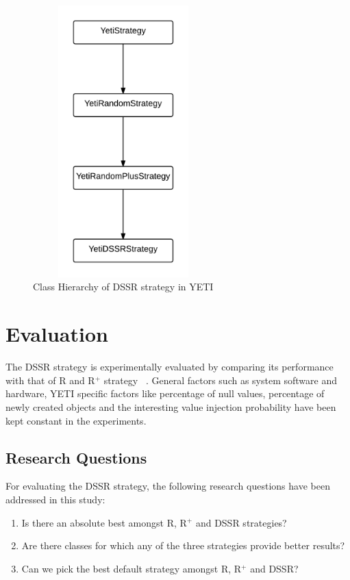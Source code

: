 \begin{figure}[h]
\centering
\includegraphics[width=7cm,height=10.5cm]{chapter4/classHierarchy1.png}
\caption{Class Hierarchy of DSSR strategy in YETI}
\label{fig:hierarchyofDSSR}
\end{figure}







\section{Evaluation}\label{sec:eval}

The DSSR strategy is experimentally evaluated by comparing its performance with that of R and R$^+$ strategy ~\cite{leitner2007reconciling}. General factors such as system software and hardware, YETI specific factors like percentage of null values, percentage of newly created objects and the interesting value injection probability have been kept constant in the experiments.

\subsection{Research Questions}
For evaluating the DSSR strategy, the following research questions have been addressed in this study:
\begin{enumerate}
\item Is there an absolute best amongst R, R$^+$ and DSSR strategies?
\item Are there classes for which any of the three strategies provide better results?
\item Can we pick the best default strategy amongst R, R$^+$ and DSSR?
\end{enumerate}



